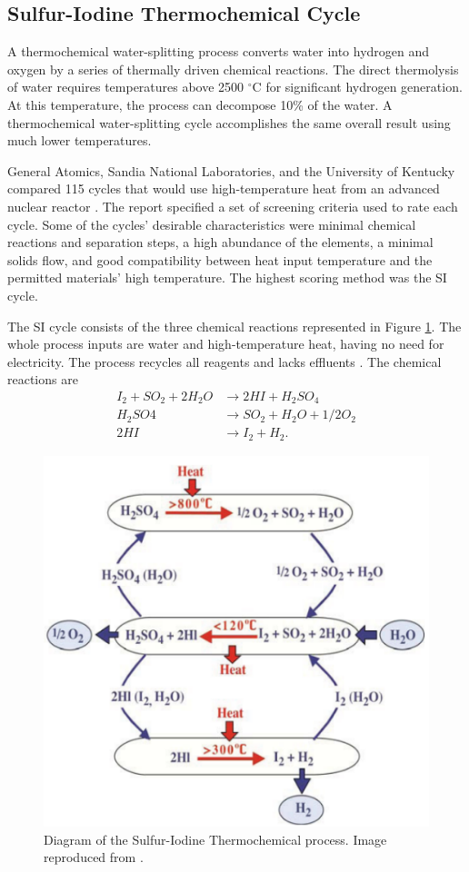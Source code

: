 \subsection{Sulfur-Iodine Thermochemical Cycle}

A thermochemical water-splitting process converts water into hydrogen and oxygen by a series of thermally driven chemical reactions.
The direct thermolysis of water requires temperatures above 2500 $^{\circ}$C for significant hydrogen generation.
At this temperature, the process can decompose 10\% of the water.
A thermochemical water-splitting cycle accomplishes the same overall result using much lower temperatures.

General Atomics, Sandia National Laboratories, and the University of Kentucky compared 115 cycles that would use high-temperature heat from an advanced nuclear reactor \cite{brown_high_2003}.
The report specified a set of screening criteria used to rate each cycle.
Some of the cycles' desirable characteristics were minimal chemical reactions and separation steps, a high abundance of the elements, a minimal solids flow, and good compatibility between heat input temperature and the permitted materials' high temperature.
The highest scoring method was the \gls{SI} cycle.

The \gls{SI} cycle consists of the three chemical reactions represented in Figure \ref{fig:sulfur1}.
The whole process inputs are water and high-temperature heat, having no need for electricity.
The process recycles all reagents and lacks effluents \cite{yildiz_efficiency_2006}.
The chemical reactions are
\begin{align}
	I_2 + SO_2 + 2H_2O &\rightarrow 2HI + H_2SO_4 \\
	H_2SO4 &\rightarrow SO_2 + H_2O + 1/2O_2 \\
	2HI &\rightarrow I_2 + H_2.
\end{align}

\begin{figure}[htbp!]
	\centering
	\includegraphics[width=0.5\linewidth]{figures-hydro/sulfur1.png}
	\hfill
	\caption{Diagram of the Sulfur-Iodine Thermochemical process. Image reproduced from \cite{benjamin_russ_sulfur_2009}.}
	\label{fig:sulfur1}
\end{figure}

